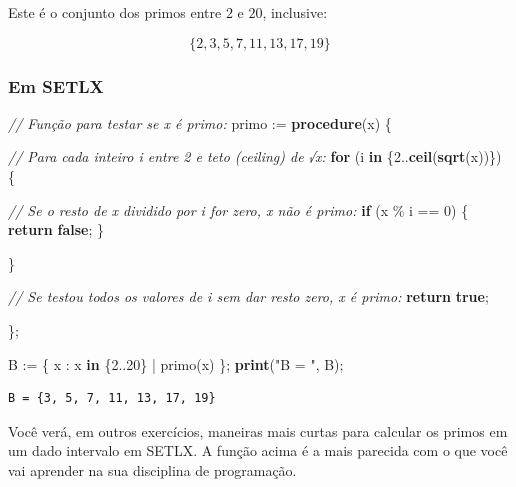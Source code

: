 \documentclass[
  letterpaper,
  DIV=11,
  numbers=noendperiod]{scrreprt}
\newenvironment{Shaded}{\begin{snugshade}}{\end{snugshade}}
\newcommand{\CommentTok}[1]{\textcolor[rgb]{0.56,0.35,0.01}{\textit{#1}}}
\newcommand{\DecValTok}[1]{\textcolor[rgb]{0.00,0.00,0.81}{#1}}
\newcommand{\KeywordTok}[1]{\textcolor[rgb]{0.13,0.29,0.53}{\textbf{#1}}}
\newcommand{\NormalTok}[1]{#1}
\newcommand{\StringTok}[1]{\textcolor[rgb]{0.31,0.60,0.02}{#1}}
\begin{document}
\begin{tcolorbox}[enhanced jigsaw, left=2mm, titlerule=0mm, colbacktitle=quarto-callout-important-color!10!white, title={Resposta (b)}, arc=.35mm, opacityback=0, bottomrule=.15mm, breakable, toprule=.15mm, colback=white, coltitle=black, bottomtitle=1mm, rightrule=.15mm, toptitle=1mm, leftrule=.75mm, colframe=quarto-callout-important-color-frame, opacitybacktitle=0.6]

Este é o conjunto dos primos entre $2$ e $20$, inclusive:

\[
\{ 2, 3, 5, 7, 11, 13, 17, 19 \}
\]

\subsubsection*{Em SETLX}\label{em-setlx-2}

\begin{Shaded}
\begin{Highlighting}[]
\CommentTok{// Função para testar se x é primo:}
\NormalTok{primo := }\KeywordTok{procedure}\NormalTok{(x) \{}
  
  \CommentTok{// Para cada inteiro i entre 2 e teto (ceiling) de √x:}
  \KeywordTok{for}\NormalTok{ (i }\KeywordTok{in}\NormalTok{ \{}\DecValTok{2}\NormalTok{..}\KeywordTok{ceil}\NormalTok{(}\KeywordTok{sqrt}\NormalTok{(x))\}) \{}
    
    \CommentTok{// Se o resto de x dividido por i for zero, x não é primo:}
    \KeywordTok{if}\NormalTok{ (x \% i == }\DecValTok{0}\NormalTok{) \{}
      \KeywordTok{return} \KeywordTok{false}\NormalTok{;}
\NormalTok{    \}}
    
\NormalTok{  \}}
  
  \CommentTok{// Se testou todos os valores de i sem dar resto zero, x é primo:}
  \KeywordTok{return} \KeywordTok{true}\NormalTok{;}
  
\NormalTok{\};}

\NormalTok{B := \{ x : x }\KeywordTok{in}\NormalTok{ \{}\DecValTok{2}\NormalTok{..}\DecValTok{20}\NormalTok{\} | primo(x) \};}
\KeywordTok{print}\NormalTok{(}\StringTok{"B = "}\NormalTok{, B);}
\end{Highlighting}
\end{Shaded}

\begin{verbatim}
B = {3, 5, 7, 11, 13, 17, 19}
\end{verbatim}

Você verá, em outros exercícios, maneiras mais curtas para calcular os
primos em um dado intervalo em SETLX. A função acima é a mais parecida
com o que você vai aprender na sua disciplina de programação.

\end{tcolorbox}
\end{document}
